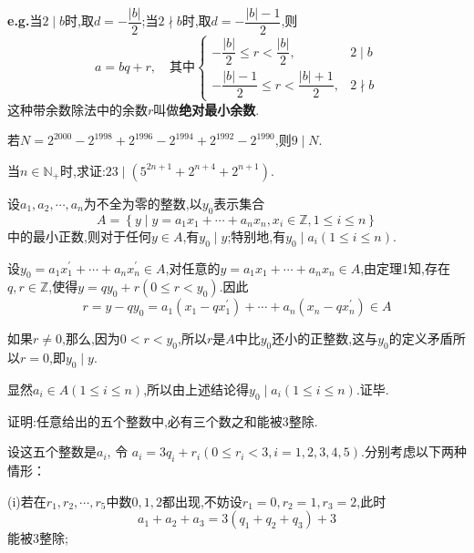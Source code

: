 \entry \textbf{e.g.}当$2 \mid b$时,取$d=-\dfrac{|b|}{2}$;当$2\nmid b$时,取$d=-\dfrac{|b|-1}{2}$,则
\begin{equation*}
	a=b q+r, \quad \text{其中}\begin{cases}
		-\dfrac{|b|}{2} \leqslant r<\dfrac{|b|}{2}, & 2 \mid b \\
		-\dfrac{|b|-1}{2} \leqslant r<\dfrac{|b|+1}{2}, & 2 \nmid b
	\end{cases}
\end{equation*}
这种带余数除法中的余数$r$叫做\textbf{绝对最小余数}.

\example 若$N=2^{2000}-2^{1998}+2^{1996}-2^{1994}+2^{1992}-2^{1990}$,则$9\mid N$.

\example 当$n\in\mathbb{N}_{+}$时,求证:$23\mid (5^{2n+1}+2^{n+4}+2^{n+1})$.

\example 设$a_{1},a_{2},\cdots,a_{n}$为不全为零的整数,以$y_{0}$表示集合
\begin{equation*}
	A=\left\lbrace y\mid y=a_{1}x_{1}+\cdots+a_{n}x_{n},x_{i}\in\mathbb{Z},1\leqslant i\leqslant n\right\rbrace 
\end{equation*}
中的最小正数,则对于任何$y\in A$,有$y_{0}\mid y$;特别地,有$y_{0}\mid a_{i}(1\leqslant i\leqslant n)$.

\proof 设$y_{0}=a_{1} x_{1}^{\prime}+\cdots+a_{n} x_{n}^{\prime} \in A$,对任意的$y=a_{1} x_{1}+\cdots+a_{n} x_{n} \in A$,由定理1知,存在$q, r \in \mathbb{Z}$,使得$y=q y_{0}+r\left(0 \leqslant r<y_{0}\right)$.因此
\begin{equation*}
	r=y-q y_{0}=a_{1}\left(x_{1}-q x_{1}^{\prime}\right)+\cdots+a_{n}\left(x_{n}-q x_{n}^{\prime}\right) \in A
\end{equation*}

如果$r \neq 0$,那么,因为$0<r<y_{0}$,所以$r$是$A$中比$y_{0}$还小的正整数,这与$y_{0}$的定义矛盾所以$r=0$,即$y_{0} \mid y$.

显然$a_{i} \in A(1 \leqslant i \leqslant n)$,所以由上述结论得$y_{0} \mid a_{i}(1 \leqslant i \leqslant n)$.证毕.

\example 证明:任意给出的五个整数中,必有三个数之和能被3整除.

\proof 设这五个整数是$a_{i}$, 令 $a_{i}=3 q_{i}+r_{i}\left(0 \leqslant r_{i}<3, i=1,2,3,4,5\right)$.分别考虑以下两种情形：

(i)若在$r_{1}, r_{2}, \cdots, r_{5}$中数$0,1,2$都出现,不妨设$r_{1}=0, r_{2}=1, r_{3}=2$,此时
\begin{equation*}
	a_{1}+a_{2}+a_{3}=3\left(q_{1}+q_{2}+q_{3}\right)+3
\end{equation*}
能被3整除;

